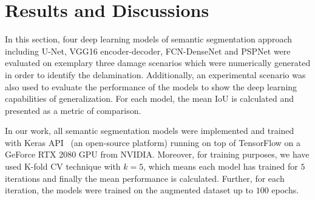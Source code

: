 \section{Results and Discussions}
In this section, four deep learning models  of semantic segmentation approach including U-Net, VGG16 encoder-decoder, FCN-DenseNet and PSPNet were evaluated on exemplary three damage scenarios  which were numerically generated in order to identify the delamination.
Additionally, an experimental scenario was also used to evaluate the performance of the models to show the deep learning capabilities of generalization.
For each model, the mean IoU is calculated and presented as a metric of comparison.

In our work, all semantic segmentation models were implemented and trained with Keras API~\cite{chollet2015keras} (an open-source platform) running on top of TensorFlow on a GeForce RTX 2080 GPU from NVIDIA. 
Moreover, for training purposes, we have used K-fold CV technique with \(k=5\), which means each model has trained for \(5\) iterations and finally the mean performance is calculated. 
Further, for each iteration, the models were trained on the augmented dataset up to \(100\) epochs.

